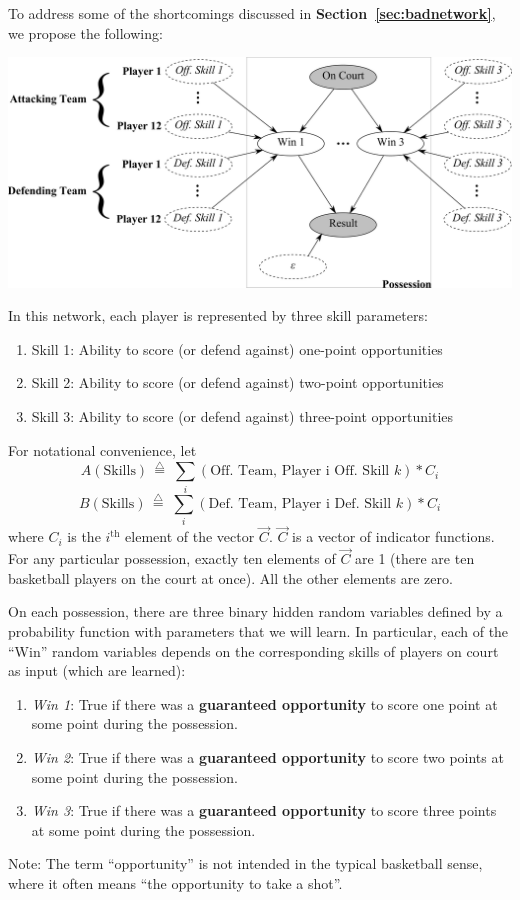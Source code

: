 \documentclass[10pt,twocolumn]{article}
\newcommand{\tridefeq}{\ensuremath{  \,{\overset{\triangle}{=}}\;   }}
\begin{document}
To address some of the shortcomings discussed in {\bf Section~\ref{sec:badnetwork}}, we propose the following:
\begin{center}
	\includegraphics[width=1.05\linewidth]{figures/newnetwork}
\end{center}

In this network, each player is represented by three skill parameters:
\begin{enumerate}
\item Skill 1: Ability to score (or defend against) one-point opportunities
\item Skill 2: Ability to score (or defend against) two-point opportunities
\item Skill 3: Ability to score (or defend against) three-point opportunities
\end{enumerate}

For notational convenience, let
\[
A\left(\mathrm{Skills}\right) \tridefeq \sum_i  \left( \textrm{Off. Team, Player i Off. Skill } k \right) * C_i
\]%
\[
B\left(\mathrm{Skills}\right) \tridefeq  \sum_i \left(  \textrm{Def. Team, Player i Def. Skill } k \right) * C_i
\]%
where $C_i$ is the $i^{\mathrm{th}}$ element of the vector $\vec C$.
$\vec C$ is a vector of indicator functions.
For any particular possession, exactly ten elements of $\vec C$ are 1 (there are ten basketball players on the court at once). All the other elements are zero.


On each possession, there are three binary hidden random variables defined by a probability function with parameters that we will learn. In particular, each of the ``Win'' random variables depends on the corresponding skills of players on court as input (which are learned):
\begin{enumerate}
\item \emph{Win 1}: True if there was a {\bf guaranteed opportunity} to score one point at some point during the possession.
\item \emph{Win 2}: True if there was a {\bf guaranteed opportunity} to score two points at some point during the possession.
\item \emph{Win 3}: True if there was a {\bf guaranteed opportunity} to score three points at some point during the possession.
\end{enumerate}
Note: The term ``opportunity'' is not intended in the typical basketball sense, where it often means ``the opportunity to take a shot''.
\end{document}

